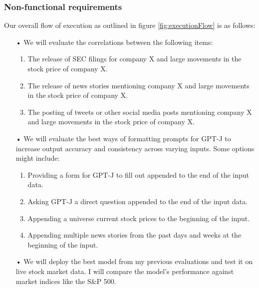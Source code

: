 \documentclass[conference]{IEEEtran}
\begin{document}
\subsubsection{Non-functional requirements}
Our overall flow of execution as outlined in figure \ref{fig:executionFlow} is as follows:
\begin{enumerate}
	\item[•] We will evaluate the correlations between the following items:
	      \begin{enumerate}
	      	\item The release of SEC filings for company X and large movements in the stock price of company X.
	      	\item The release of news stories mentioning company X and large movements in the stock price of company X.
	      	\item The posting of tweets or other social media posts mentioning company X and large movements in the stock price of company X.
	      \end{enumerate}
	\item[•] We will evaluate the best ways of formatting prompts for GPT-J to increase output accuracy and consistency across varying inputs. Some options might include:
	      \begin{enumerate}
	      	\item Providing a form for GPT-J to fill out appended to the end of the input data.
	      	\item Asking GPT-J a direct question appended to the end of the input data.
	      	\item Appending a universe current stock prices to the beginning of the input.
	      	\item Appending multiple news stories from the past days and weeks at the beginning of the input.
	      \end{enumerate}
	\item[•] We will deploy the best model from my previous evaluations and test it on live stock market data. I will compare the model's performance against market indices like the S\&P 500. 
\end{enumerate}
\end{document}
